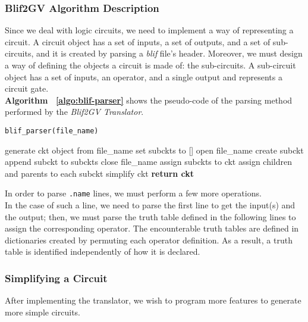 \documentclass[]{usiinfbachelorproject}
\begin{document}
\subsubsection{Blif2GV Algorithm Description}\label{subsubsec:high-level-description}
Since we deal with logic circuits, we need to implement a way of representing a circuit. A circuit object has a set of inputs, a set of outputs, and a set of sub-circuits, and it is created by parsing a \textit{blif} file's header. Moreover, we must design a way of defining the objects a circuit is made of: the sub-circuits. A sub-circuit object has a set of inputs, an operator, and a single output and represents a circuit gate. \\
\textbf{Algorithm ~\ref{algo:blif-parser}} shows the pseudo-code of the parsing method performed by the \textit{Blif2GV Translator}.
\begin{algorithm}[H]
    \caption{\texttt{blif\_parser(file\_name)}}
    \begin{algorithmic}[1]
        \State generate ckt object from file\_name
        \State set subckts to []
        \State open file\_name
            \State create subckt
            \State append subckt to subckts
        \EndFor
        \State close file\_name
        \State assign subckts to ckt
        \State assign children and parents to each subckt
        \State simplify ckt
        \State \textbf{return ckt}
    \end{algorithmic}
    \label{algo:blif-parser}
\end{algorithm}
\noindent
In order to parse \texttt{.name} lines, we must perform a few more operations. \\
In the case of such a line, we need to parse the first line to get the input(s) and the output; then, we must parse the truth table defined in the following lines to assign the corresponding operator. The encounterable truth tables are defined in dictionaries created by permuting each operator definition. As a result, a truth table is identified independently of how it is declared.
\subsubsection{Simplifying a Circuit}\label{subsubsec:simplifying-circuit}
After implementing the translator, we wish to program more features to generate more simple circuits. 
\end{document}
